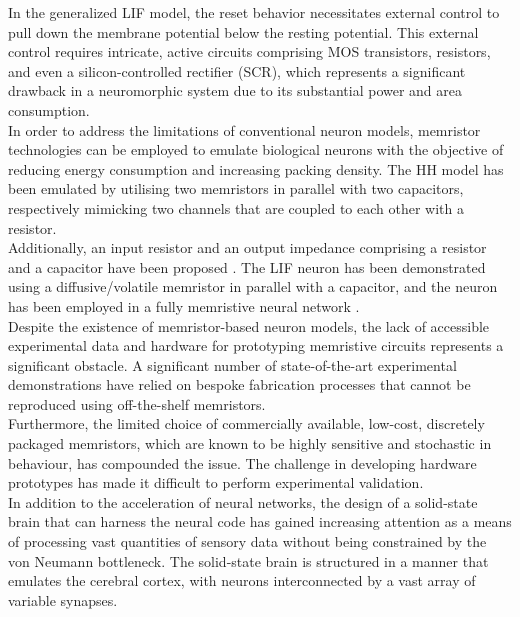 \noindent In the generalized LIF model, the reset behavior necessitates external control to pull down the membrane potential below the resting potential. This external control requires intricate, active circuits comprising MOS transistors, resistors, and even a silicon-controlled rectifier (SCR), which represents a significant drawback in a neuromorphic system due to its substantial power and area consumption. \\

\noindent In order to address the limitations of conventional neuron models, memristor technologies can be employed to emulate biological neurons with the objective of reducing energy consumption and increasing packing density. The HH model has been emulated by utilising two memristors in parallel with two capacitors, respectively mimicking two channels that are coupled to each other with a resistor. \\

\noindent Additionally, an input resistor and an output impedance comprising a resistor and a capacitor have been proposed \cite{pickett2013scalable}. The LIF neuron has been demonstrated using a diffusive/volatile memristor in parallel with a capacitor, and the neuron has been employed in a fully memristive neural network \cite{wang2018fully}. \\

\noindent Despite the existence of memristor-based neuron models, the lack of accessible experimental data and hardware for prototyping memristive circuits represents a significant obstacle. A significant number of state-of-the-art experimental demonstrations have relied on bespoke fabrication processes that cannot be reproduced using off-the-shelf memristors. \\

\noindent Furthermore, the limited choice of commercially available, low-cost, discretely packaged memristors, which are known to be highly sensitive and stochastic in behaviour, has compounded the issue. The challenge in developing hardware prototypes has made it difficult to perform experimental validation. \\

\noindent In addition to the acceleration of neural networks, the design of a solid-state brain that can harness the neural code has gained increasing attention as a means of processing vast quantities of sensory data without being constrained by the von Neumann bottleneck. The solid-state brain is structured in a manner that emulates the cerebral cortex, with neurons interconnected by a vast array of variable synapses. \\


